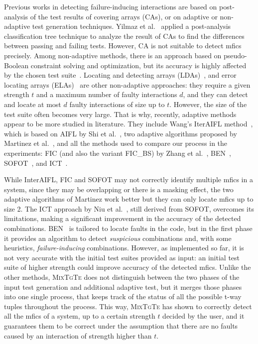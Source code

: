 \documentclass[
12pt, %
oneside, %
english, %
singlespacing, %
headsepline, %
consistentlayout, %
]{MastersDoctoralThesis} %
\newcommand{\mix}{\textsc{MixTgTe}\xspace}
\newcommand{\mfics}{\textsf{mfics}\xspace}
\theoremstyle{plain}
\theoremstyle{definition}
\theoremstyle{remark}
\theoremstyle{plain}
\theoremstyle{plain}
\theoremstyle{remark}
\begin{document}
Previous works in detecting failure-inducing interactions are based on post-analysis of the test results of covering arrays (CAs), or on adaptive or non-adaptive test generation techniques. Yilmaz et al.~\cite{CohenTSE06} applied a post-analysis classification tree technique to analyze the result of CAs to find the differences between passing and failing tests. However, CA is not suitable to detect \mfics precisely. Among non-adaptive methods, there is an approach based on pseudo-Boolean constraint solving and optimization, but its accuracy is highly affected by the chosen test suite~\cite{Zhang2012FII}.
Locating and detecting arrays (LDAs)~\cite{colbourn_locating_2008}, 
and error locating arrays (ELAs)~\cite{martinez_locating_2010} are other non-adaptive approaches: they require a given strength $t$ and a maximum number of faulty interactions $d$, and they can detect and locate at most $d$ faulty interactions of size up to $t$. However, the size of the test suite often becomes very large. That is why, recently, adaptive methods appear to be more studied in literature. They include Wang's IterAIFL method~\cite{wang_adaptive_2010}, which is based on AIFL by Shi et al.~\cite{shi_software_nodate}, two adaptive algorithms proposed by Martinez et al.~\cite{martinez_locating_2010}, and all the methods used to compare our process in the experiments: FIC (and also the variant FIC\_BS) by Zhang et al.~\cite{zhang_characterizing_2011}, BEN~\cite{ghandehari2018combinatorial}, SOFOT~\cite{nie_2011}, and ICT~\cite{Niu2018interleaving}.

While InterAIFL, FIC and SOFOT may not correctly identify multiple \mfics in a system, since they may be overlapping or there is a masking effect, the two adaptive algorithms of Martinez work better but they can only locate \mfics up to size 2. The ICT approach by Niu et al.~\cite{Niu2018interleaving}, still derived from SOFOT, overcomes its limitations, making a significant improvement in the accuracy of the detected combinations. BEN~\cite{ghandehari2018combinatorial} is tailored to locate faults in the code, but in the first phase it provides an algorithm to detect \textit{suspicious} combinations and, with some heuristics, \textit{failure-inducing} combinations. However, as implemented so far, it is not very accurate with the initial test suites provided as input: an initial test suite of higher strength could improve accuracy of the detected \mfics. Unlike the other methods, \mix does not distinguish between the two phases of the input test generation and additional adaptive test, but it merges those phases into one single process, that keeps track of the status of all the possible t-way tuples throughout the process. This way, \mix has shown to correctly detect all the \mfics of a system, up to a certain strength $t$ decided by the user, and it guarantees them to be correct under the assumption that there are no faults caused by an interaction of strength higher than $t$.
\end{document}
